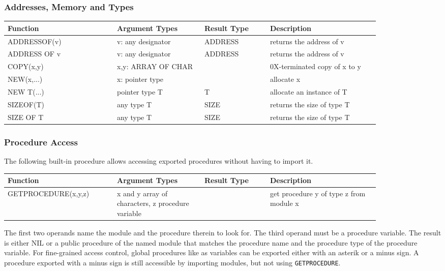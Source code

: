 \documentclass[a4wide,11pt]{article}
\begin{document}
\subsubsection{Addresses, Memory and Types}
\begin{longtable}{|p{0.25\linewidth}|p{0.2\linewidth}|p{0.15\linewidth}|p{0.25\linewidth}|}
\hline
Function & Argument Types & Result Type & Description \\
\hline\hline
\endhead
ADDRESSOF(v) & v: any designator & ADDRESS & returns the address of v \\
ADDRESS OF v & v: any designator & ADDRESS & returns the address of v \\
COPY(x,y) & x,y: ARRAY OF CHAR& & 0X-terminated copy of x to y \\
NEW(x,...) & x: pointer type & & allocate x\\
NEW T(...) & pointer type T & T & allocate an instance of T\\
SIZEOF(T)  & any type T & SIZE & returns the size of type T \\
SIZE OF T & any type T & SIZE & returns the size of type T \\
\hline
\end{longtable}

\subsubsection{Procedure Access}

The following built-in procedure allows accessing exported procedures without having to import it.

\begin{longtable}{|p{0.25\linewidth}|p{0.2\linewidth}|p{0.15\linewidth}|p{0.25\linewidth}|}
\hline
Function & Argument Types & Result Type & Description \\
\hline\hline
\endhead
GETPROCEDURE(x,y,z) & x and y array of characters, z procedure variable & & get procedure y of type z from module x \\
\hline
\end{longtable}

The first two operands name the module and the procedure therein to look for. The third operand must be a procedure variable. The result is either NIL or a public procedure of the named module that matches the procedure name and the procedure type of the procedure variable.
For fine-grained access control, global procedures like as variables can be exported either with an asterik or a minus sign.
A procedure exported with a minus sign is still accessible by importing modules, but not using \texttt{GETPROCEDURE}.
\end{document}
